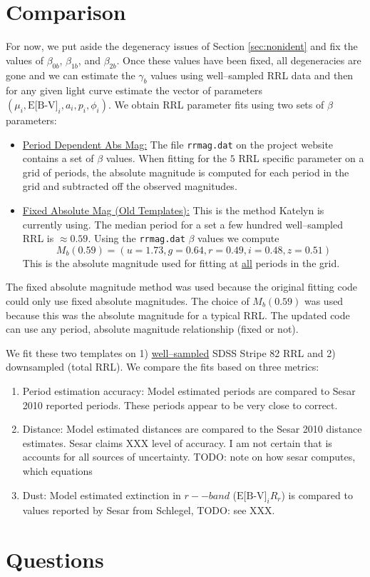 \documentclass[12pt]{article}
\newcommand{\todo}[1]{{\color{red}TODO: #1}}
\begin{document}
\section{Comparison}
\label{sec:compare}

For now, we put aside the degeneracy issues of Section \ref{sec:nonident} and fix the values of $\beta_{0b}$, $\beta_{1b}$, and $\beta_{2b}$. Once these values have been fixed, all degeneracies are gone and we can estimate the $\gamma_b$ values using well--sampled RRL data and then for any given light curve estimate the vector of parameters $(\mu_i,\text{E[B-V]}_i,a_i,p_i,\phi_i)$. We obtain RRL parameter fits using two sets of $\beta$ parameters:
\begin{itemize}
\item \underline{Period Dependent Abs Mag:} The file \texttt{rrmag.dat} on the project website contains a set of $\beta$ values. When fitting for the $5$ RRL specific parameter on a grid of periods, the absolute magnitude is computed for each period in the grid and subtracted off the observed magnitudes.
\item \underline{Fixed Absolute Mag (Old Templates):} This is the method Katelyn is currently using. The median period for a set a few hundred well--sampled RRL is $\approx 0.59$. Using the \texttt{rrmag.dat} $\beta$ values we compute
  \begin{equation*}
    M_b(0.59) = (u=1.73,g=0.64,r=0.49,i=0.48,z=0.51)
  \end{equation*}
  This is the absolute magnitude used for fitting at \underline{all} periods in the grid.
\end{itemize}
The fixed absolute magnitude method was used because the original fitting code could only use fixed absolute magnitudes. The choice of $M_b(0.59)$ was used because this was the absolute magnitude for a typical RRL. The updated code can use any period, absolute magnitude relationship (fixed or not).

We fit these two templates on 1) \underline{well--sampled} SDSS Stripe 82 RRL and 2) downsampled (total RRL). We compare the fits based on three metrics:
\begin{enumerate}
\item Period estimation accuracy: Model estimated periods are compared to Sesar 2010 reported periods. These periods appear to be very close to correct.
\item Distance: Model estimated distances are compared to the Sesar 2010 distance estimates. Sesar claims XXX level of accuracy. I am not certain that is accounts for all sources of uncertainty. \todo{note on how sesar computes, which equations}
\item Dust: Model estimated extinction in $r--band$ ($\text{E[B-V]}_iR_r$) is compared to values reported by Sesar from Schlegel, \todo{see XXX}.
\end{enumerate}

\section{Questions}
\label{sec:questions}



%
%
\end{document}
